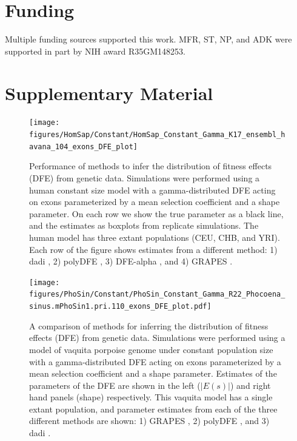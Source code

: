 \documentclass[hidelinks]{article}
\newcommand{\beginsupplement}{%
        \fancyhead[L]{Supplemental Material}
        \setcounter{table}{0}
        \renewcommand{\thetable}{S\arabic{table}}%
        \setcounter{figure}{0}
        \renewcommand{\thefigure}{S\arabic{figure}}%
     }
\begin{document}
\section*{Funding}
    \label{funding}
    Multiple funding sources supported this work.
    MFR, ST, NP, and ADK were supported in part by NIH award R35GM148253.
\printbibliography

\clearpage
\beginsupplement

\section*{Supplementary Material}

\begin{figure}[h]
    \centering
    \texttt{[image: figures/HomSap/Constant/HomSap\_Constant\_Gamma\_K17\_ensembl\_havana\_104\_exons\_DFE\_plot]}
    \caption{
    Performance of methods to infer the distribution of fitness effects (DFE) from genetic data.
    Simulations were performed using a human constant size model with a gamma-distributed DFE
    acting on exons parameterized by a mean selection coefficient and a shape parameter. On each row we show the true parameter 
    as a black line, and the estimates as boxplots from replicate simulations. The human model has three extant populations (CEU, CHB, and YRI).
    Each row of the figure shows estimates from a different method: 1) dadi \citep{gutenkunst2009inferring}, 2) polyDFE \citep{tataru2020polydfe},  
    3) DFE-alpha \citep{eyre2009estimating}, and 4) GRAPES \citep{galtier2016adaptive}.  
    }
    \label{fig:homsap-dfe.constant}    
\end{figure}

\begin{figure}
    \centering
    \texttt{[image: figures/PhoSin/Constant/PhoSin\_Constant\_Gamma\_R22\_Phocoena\_sinus.mPhoSin1.pri.110\_exons\_DFE\_plot.pdf]}
    \caption{
    \label{fig:vaquita-dfe.constant}
    A comparison of methods for inferring the distribution of fitness effects (DFE) from genetic data.
    Simulations were performed using a model of vaquita porpoise genome under constant population size with a gamma-distributed DFE
    acting on exons parameterized by a mean selection coefficient and a shape parameter. Estimates of the 
    parameters of the DFE are shown in the left ($\lvert E(s) \rvert $) and right hand panels (shape) respectively.
    This vaquita model has a single extant population, and parameter estimates from each
    of the three different methods are shown: 1) GRAPES \citep{galtier2016adaptive}, 2) polyDFE \citep{tataru2020polydfe},
    and 3) dadi \citep{gutenkunst2009inferring}.}
\end{figure}
\end{document}
